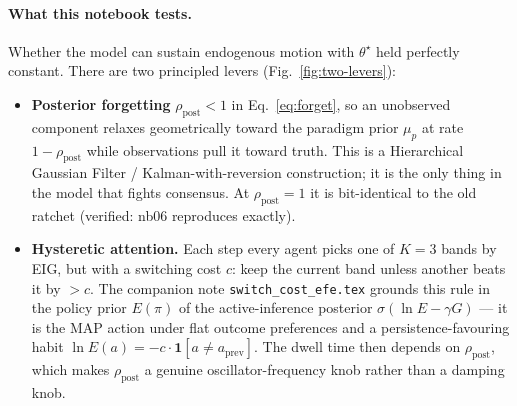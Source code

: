 \documentclass[11pt,a4paper]{article}
\theoremstyle{plain}
\begin{document}
\paragraph{What this notebook tests.} Whether the model can sustain
endogenous motion with $\theta^\star$ held perfectly constant. There
are two principled levers (Fig.~\ref{fig:two-levers}):
\begin{itemize}\itemsep1pt
\item \textbf{Posterior forgetting} $\rho_{\text{post}}<1$ in
Eq.~\eqref{eq:forget}, so an unobserved component relaxes geometrically
toward the paradigm prior $\mu_p$ at rate $1-\rho_{\text{post}}$ while
observations pull it toward truth. This is a Hierarchical Gaussian
Filter / Kalman-with-reversion construction; it is the only thing in
the model that fights consensus. At $\rho_{\text{post}}=1$ it is
bit-identical to the old ratchet (verified: nb06 reproduces exactly).
\item \textbf{Hysteretic attention.} Each step every agent picks one
of $K=3$ bands by EIG, but with a switching cost $c$: keep the current
band unless another beats it by $>c$. The companion note
\texttt{switch\_cost\_efe.tex} grounds this rule in the policy prior
$E(\pi)$ of the active-inference posterior $\sigma(\ln E - \gamma G)$
--- it is the MAP action under flat outcome preferences and a
persistence-favouring habit $\ln E(a)=-c\cdot\mathbf{1}[a\neq
a_{\text{prev}}]$. The dwell time then depends on
$\rho_{\text{post}}$, which makes $\rho_{\text{post}}$ a genuine
oscillator-frequency knob rather than a damping knob.
\end{itemize}
\end{document}
